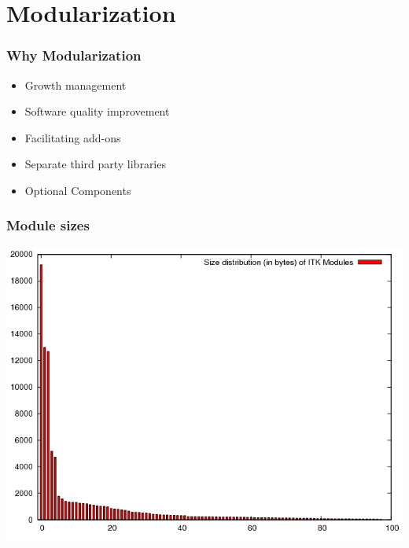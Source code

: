 \section{Modularization}

\begin{frame}
\frametitle{Why Modularization}
\begin{itemize}
\item Growth management
\item Software quality improvement
\item Facilitating add-ons
\item Separate third party libraries
\item Optional Components
\end{itemize}
\end{frame}

\begin{frame}
\frametitle{Module sizes}
\center
\begin{center}
\includegraphics[height=0.8\textheight]{../Art/moduleSizePlot.png}
\end{center}
\end{frame}

